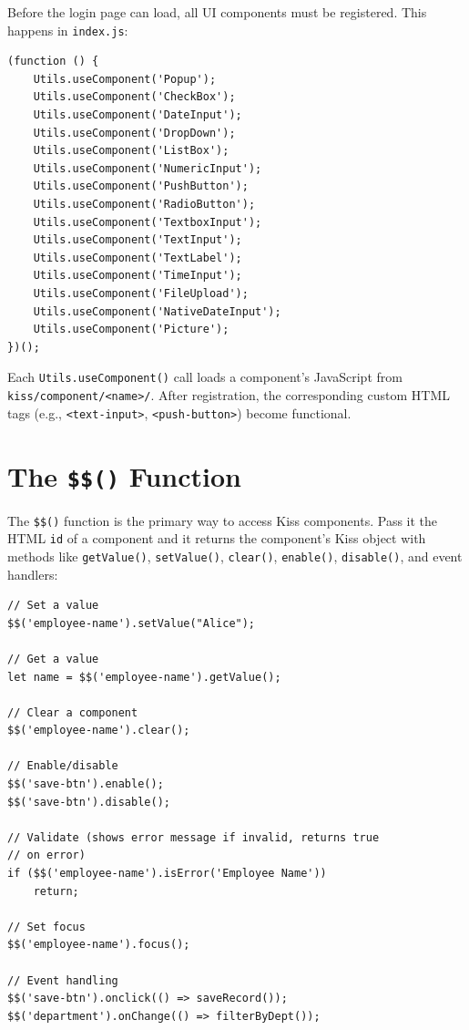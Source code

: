 Before the login page can load, all UI components must be registered.  This happens in \texttt{index.js}:

\begin{lstlisting}[style=javascript]
(function () {
    Utils.useComponent('Popup');
    Utils.useComponent('CheckBox');
    Utils.useComponent('DateInput');
    Utils.useComponent('DropDown');
    Utils.useComponent('ListBox');
    Utils.useComponent('NumericInput');
    Utils.useComponent('PushButton');
    Utils.useComponent('RadioButton');
    Utils.useComponent('TextboxInput');
    Utils.useComponent('TextInput');
    Utils.useComponent('TextLabel');
    Utils.useComponent('TimeInput');
    Utils.useComponent('FileUpload');
    Utils.useComponent('NativeDateInput');
    Utils.useComponent('Picture');
})();
\end{lstlisting}

\noindent
Each \texttt{Utils.useComponent()} call loads a component's JavaScript from \texttt{kiss/component/<name>/}.  After registration, the corresponding custom HTML tags (e.g., \texttt{<text-input>}, \texttt{<push-button>}) become functional.

\section{The \texttt{\$\$()} Function}
\label{sec:fe-dollardollar}

The \texttt{\$\$()}\index{\$\$()} function is the primary way to access Kiss components.  Pass it the HTML \texttt{id} of a component and it returns the component's Kiss object with methods like \texttt{getValue()}, \texttt{setValue()}, \texttt{clear()}, \texttt{enable()}, \texttt{disable()}, and event handlers:

\begin{lstlisting}[style=javascript]
// Set a value
$$('employee-name').setValue("Alice");

// Get a value
let name = $$('employee-name').getValue();

// Clear a component
$$('employee-name').clear();

// Enable/disable
$$('save-btn').enable();
$$('save-btn').disable();

// Validate (shows error message if invalid, returns true
// on error)
if ($$('employee-name').isError('Employee Name'))
    return;

// Set focus
$$('employee-name').focus();

// Event handling
$$('save-btn').onclick(() => saveRecord());
$$('department').onChange(() => filterByDept());
\end{lstlisting}

